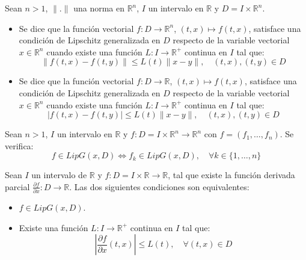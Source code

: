 \begin{definition}
    Sean $n > 1$, $\|.\|$ una norma en $\mathbb{R}^n$, $I$ un intervalo en $\mathbb{R}$ y $D = I \times \mathbb{R}^n$.
    \begin{itemize}
        \item Se dice que la función vectorial $f: D \to \mathbb{R}^n$, $(t, x) \mapsto f(t, x)$, satisface una condición de Lipschitz generalizada en $D$ respecto de la variable vectorial $x \in \mathbb{R}^n$ cuando existe una función $L: I \to \mathbb{R}^+$ continua en $I$ tal que:
              $$\|f(t, x) - f(t, y)\| \leq L(t)\|x-y\|, \quad (t, x), (t, y) \in D$$
        \item Se dice que la función vectorial $f: D \to \mathbb{R}$, $(t, x) \mapsto f(t, x)$, satisface una condición de Lipschitz generalizada en $D$ respecto de la variable vectorial $x \in \mathbb{R}^n$ cuando existe una función $L: I \to \mathbb{R}^+$ continua en $I$ tal que:
              $$|f(t, x) - f(t, y)| \leq L(t)\|x-y\|, \quad (t, x), (t, y) \in D$$
    \end{itemize}
\end{definition}

\begin{proposition}
    Sean $n > 1$, $I$ un intervalo en $\mathbb{R}$ y $f: D = I \times \mathbb{R}^n \to \mathbb{R}^n$ con $f = (f_1, \dots, f_n)$.
    Se verifica:
    $$f \in LipG(x, D) \Leftrightarrow f_k \in LipG(x, D), \quad \forall k \in \{1, \dots, n\}$$
\end{proposition}

\begin{proposition}
    Sean $I$ un intervalo de $\mathbb{R}$ y $f: D = I \times \mathbb{R} \to \mathbb{R}$, tal que existe la función derivada parcial $\frac{\partial f}{\partial x}: D \to \mathbb{R}$.
    Las dos siguientes condiciones son equivalentes:
    \begin{itemize}
        \item $f \in LipG(x, D)$.
        \item Existe una función $L: I \to \mathbb{R}^+$ continua en $I$ tal que:
              $$|\frac{\partial f}{\partial x}(t, x)| \leq L(t), \quad \forall (t, x) \in D$$
    \end{itemize}
\end{proposition}

